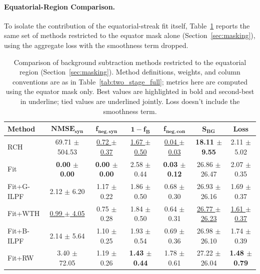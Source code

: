 \documentclass[iucr]{iucrjournals}
\begin{document}
\paragraph{Equatorial-Region Comparison.}
To isolate the contribution of the equatorial-streak fit itself, Table~\ref{tab:two_stage_equator} reports the same set of methods restricted to the equator mask alone (Section~\ref{sec:masking}), using the aggregate loss with the smoothness term dropped.




\begin{table}[t]
\caption{Comparison of background subtraction methods restricted to the equatorial region (Section~\ref{sec:masking}). Method definitions, weights, and column conventions are as in Table~\ref{tab:two_stage_full}; metrics here are computed using the equator mask only. Best values are highlighted in bold and second-best in underline; tied values are underlined jointly. Loss doesn't include the smoothness term.}
\label{tab:two_stage_equator}
\centering
\small
\setlength{\tabcolsep}{3pt}
\renewcommand{\arraystretch}{1.1}
\begin{tabular}{@{}lcccccc@{}}
\toprule
\textbf{Method} & $\mathbf{NMSE}_{\mathbf{syn}}$ & $\mathbf{f}_{\mathbf{neg,syn}}$ & $\mathbf{1-f_B}$ & $\mathbf{f}_{\mathbf{neg,con}}$ & $\mathbf{S}_{\mathbf{BG}}$ & \textbf{Loss} \\
\midrule
RCH & 69.71 $\pm$ 504.53 & \underline{0.72 $\pm$ 0.37} & \underline{1.67 $\pm$ 0.50} & \underline{0.04 $\pm$ 0.03} & \textbf{18.11 $\pm$ 9.55} & 2.11 $\pm$ 5.02 \\
Fit & \textbf{0.00 $\pm$ 0.00} & \textbf{0.00 $\pm$ 0.00} & 2.58 $\pm$ 0.44 & \textbf{0.03 $\pm$ 0.12} & 26.86 $\pm$ 26.47 & 2.07 $\pm$ 0.35 \\
Fit+G-ILPF & 2.12 $\pm$ 6.20 & 1.17 $\pm$ 0.22 & 1.86 $\pm$ 0.50 & 0.68 $\pm$ 0.30 & 26.93 $\pm$ 26.16 & 1.69 $\pm$ 0.37 \\
Fit+WTH & \underline{0.99 $\pm$ 4.05} & 0.75 $\pm$ 0.28 & 1.84 $\pm$ 0.50 & 0.64 $\pm$ 0.31 & \underline{26.77 $\pm$ 26.23} & \underline{1.61 $\pm$ 0.37} \\
Fit+B-ILPF & 2.14 $\pm$ 5.64 & 1.10 $\pm$ 0.25 & 1.93 $\pm$ 0.54 & 0.69 $\pm$ 0.36 & 26.98 $\pm$ 26.10 & 1.74 $\pm$ 0.39 \\
Fit+RW & 3.40 $\pm$ 72.05 & 1.19 $\pm$ 0.26 & \textbf{1.43 $\pm$ 0.44} & 1.78 $\pm$ 0.61 & 27.22 $\pm$ 26.04 & \textbf{1.48 $\pm$ 0.79} \\
\bottomrule
\end{tabular}
\end{table}
\end{document}
